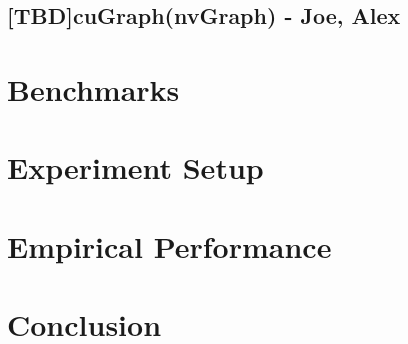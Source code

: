 \documentclass[conference]{IEEEtran}
\begin{document}
\subsection{[TBD]cuGraph(nvGraph) - Joe, Alex}


\section{Benchmarks}
\label{sec:benchmark-method}


\section{Experiment Setup}
\label{sec:experiment-setup}


\section{Empirical Performance}
\label{sec:experiment-results}


\section{Conclusion}
\label{sec:conclusion}






%

%
\end{document}
